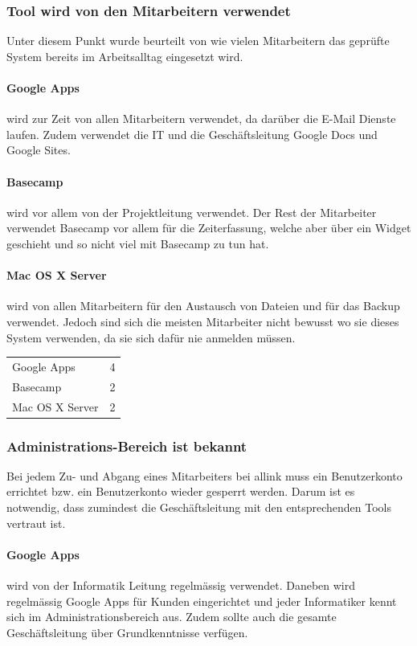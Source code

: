 \subsubsection{Tool wird von den Mitarbeitern verwendet}
\label{ssub:Tool wird von den Mitarbeitern verwendet}
Unter diesem Punkt wurde beurteilt von wie vielen Mitarbeitern das geprüfte System bereits im Arbeitsalltag eingesetzt wird.
\paragraph{Google Apps}
\label{par:1.2Google Apps}
wird zur Zeit von allen Mitarbeitern verwendet, da darüber die E-Mail Dienste laufen. Zudem verwendet die IT und die Geschäftsleitung Google Docs und Google Sites.
\paragraph{Basecamp}
\label{par:1.2Basecamp}
wird vor allem von der Projektleitung verwendet. Der Rest der Mitarbeiter verwendet Basecamp vor allem für die Zeiterfassung, welche aber über ein Widget geschieht und so nicht viel mit Basecamp zu tun hat.
\paragraph{Mac OS X Server}
\label{par:1.2Mac OS X Server}
wird von allen Mitarbeitern für den Austausch von Dateien und für das Backup verwendet. Jedoch sind sich die meisten Mitarbeiter nicht bewusst wo sie dieses System verwenden, da sie sich dafür nie anmelden müssen.

\begin{tabular}{lc}
Google Apps & 4\\
Basecamp & 2\\
Mac OS X Server & 2\\
\end{tabular}

\subsubsection{Administrations-Bereich ist bekannt}
\label{ssub:Adminbereich ist bekannt}
Bei jedem Zu- und Abgang eines Mitarbeiters bei allink muss ein Benutzerkonto errichtet bzw. ein Benutzerkonto wieder gesperrt werden. Darum ist es notwendig, dass zumindest die Geschäftsleitung mit den entsprechenden Tools vertraut ist.
\paragraph{Google Apps}
\label{par:1.3Google Apps}
wird von der Informatik Leitung regelmässig verwendet. Daneben wird regelmässig Google Apps für Kunden eingerichtet und jeder Informatiker kennt sich im Administrationsbereich aus. Zudem sollte auch die gesamte Geschäftsleitung über Grundkenntnisse verfügen.
